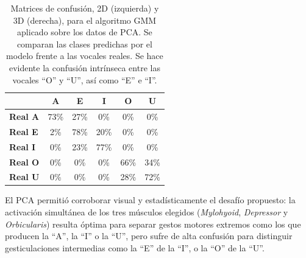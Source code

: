 \begin{table}[H]
\begin{minipage}{0.48\linewidth}
{\begin{tabular}{lccccc}
             & \textbf{A} & \textbf{E} & \textbf{I} & \textbf{O} & \textbf{U} \\
            \midrule
            \textbf{Real A} & \cellcolor[rgb]{0.49,0.49,1.00} \color{white} 73\% & \cellcolor[rgb]{0.81,0.81,1.00}  27\% & \cellcolor[rgb]{1.00,1.00,1.00}  0\% & \cellcolor[rgb]{1.00,1.00,1.00}  0\% & \cellcolor[rgb]{1.00,1.00,1.00}  0\% \\
            \textbf{Real E} & \cellcolor[rgb]{0.99,0.99,1.00}  2\% & \cellcolor[rgb]{0.45,0.45,1.00} \color{white} 78\% & \cellcolor[rgb]{0.86,0.86,1.00}  20\% & \cellcolor[rgb]{1.00,1.00,1.00}  0\% & \cellcolor[rgb]{1.00,1.00,1.00}  0\% \\
            \textbf{Real I} & \cellcolor[rgb]{1.00,1.00,1.00}  0\% & \cellcolor[rgb]{0.84,0.84,1.00}  23\% & \cellcolor[rgb]{0.46,0.46,1.00} \color{white} 77\% & \cellcolor[rgb]{1.00,1.00,1.00}  0\% & \cellcolor[rgb]{1.00,1.00,1.00}  0\% \\
            \textbf{Real O} & \cellcolor[rgb]{1.00,1.00,1.00}  0\% & \cellcolor[rgb]{1.00,1.00,1.00}  0\% & \cellcolor[rgb]{1.00,1.00,1.00}  0\% & \cellcolor[rgb]{0.54,0.54,1.00} \color{white} 66\% & \cellcolor[rgb]{0.76,0.76,1.00}  34\% \\
            \textbf{Real U} & \cellcolor[rgb]{1.00,1.00,1.00}  0\% & \cellcolor[rgb]{1.00,1.00,1.00}  0\% & \cellcolor[rgb]{1.00,1.00,1.00}  0\% & \cellcolor[rgb]{0.80,0.80,1.00}  28\% & \cellcolor[rgb]{0.50,0.50,1.00} \color{white} 72\% \\
            \bottomrule
            \end{tabular}%
        }
    \end{minipage}
    \caption{Matrices de confusión, 2D (izquierda) y 3D (derecha), para el algoritmo GMM aplicado sobre los datos de PCA. Se comparan las clases predichas por el modelo frente a las vocales reales. Se hace evidente la confusión intrínseca entre las vocales \enquote{O} y \enquote{U}, así como \enquote{E} e \enquote{I}.}
    \label{tab:pca_confusion}
\end{table}

El PCA permitió corroborar visual y estadísticamente el desafío propuesto: la activación simultánea de los tres músculos elegidos (\textit{Mylohyoid}, \textit{Depressor} y \textit{Orbicularis}) resulta óptima para separar gestos motores extremos como los que producen la \enquote{A}, la \enquote{I} o la \enquote{U}, pero sufre de alta confusión para distinguir gesticulaciones intermedias como la \enquote{E} de la \enquote{I}, o la \enquote{O} de la \enquote{U}.

